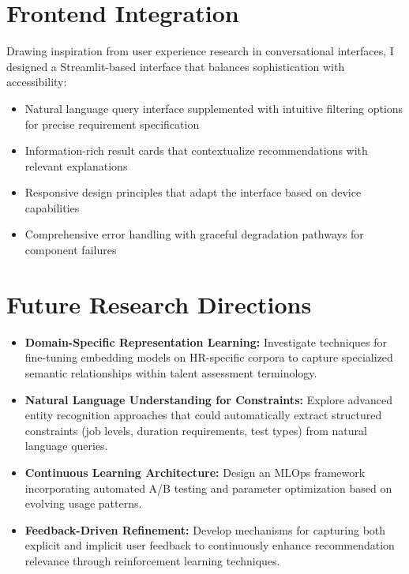 \documentclass[10pt,a4paper,twocolumn]{article}
\begin{document}
\section{Frontend Integration}
\small
Drawing inspiration from user experience research in conversational interfaces, I designed a Streamlit-based interface that balances sophistication with accessibility:
\begin{itemize}[leftmargin=*,itemsep=2pt,topsep=0pt,parsep=0pt]
    \item Natural language query interface supplemented with intuitive filtering options for precise requirement specification
    \item Information-rich result cards that contextualize recommendations with relevant explanations
    \item Responsive design principles that adapt the interface based on device capabilities
    \item Comprehensive error handling with graceful degradation pathways for component failures
\end{itemize}

\section{Future Research Directions}
\small
\begin{itemize}[leftmargin=*,itemsep=2pt,topsep=0pt,parsep=0pt]
    \item \textbf{Domain-Specific Representation Learning:} Investigate techniques for fine-tuning embedding models on HR-specific corpora to capture specialized semantic relationships within talent assessment terminology.
    
    \item \textbf{Natural Language Understanding for Constraints:} Explore advanced entity recognition approaches that could automatically extract structured constraints (job levels, duration requirements, test types) from natural language queries.
    
    \item \textbf{Continuous Learning Architecture:} Design an MLOps framework incorporating automated A/B testing and parameter optimization based on evolving usage patterns.
    
    \item \textbf{Feedback-Driven Refinement:} Develop mechanisms for capturing both explicit and implicit user feedback to continuously enhance recommendation relevance through reinforcement learning techniques.
\end{itemize}
\end{document}
